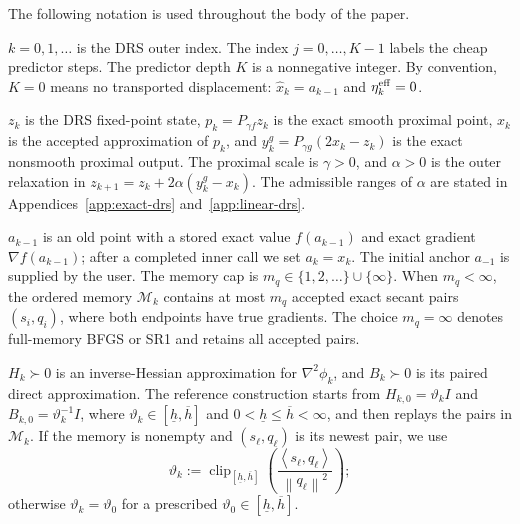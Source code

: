 \documentclass[10pt,leqno]{amsart}
\numberwithin{equation}{section}
\numberwithin{algorithm}{section}
\theoremstyle{remark}
\newcommand{\norm}[1]{\left\lVert #1 \right\rVert}
\newcommand{\ip}[2]{\left\langle #1,#2 \right\rangle}
\newcommand{\grad}{\nabla}
\begin{document}
The following notation is used throughout the body of the paper.
\begin{description}[style=nextline,leftmargin=2.8em,labelindent=0em]
\item[Outer and predictor indices.]
$k=0,1,\ldots$ is the DRS outer index.  The index $j=0,\ldots,K-1$ labels the cheap predictor steps.  The predictor depth $K$ is a nonnegative integer.  By convention, $K=0$ means no transported displacement: $\widehat x_k=a_{k-1}$ and $\eta_k^{\rm eff}=0$.

\item[DRS variables.]
$z_k$ is the DRS fixed-point state, $p_k=P_{\gamma f}z_k$ is the exact smooth proximal point, $x_k$ is the accepted approximation of $p_k$, and $y_k^g=P_{\gamma g}(2x_k-z_k)$ is the exact nonsmooth proximal output.  The proximal scale is $\gamma>0$, and $\alpha>0$ is the outer relaxation in $z_{k+1}=z_k+2\alpha(y_k^g-x_k)$.  The admissible ranges of $\alpha$ are stated in Appendices~\ref{app:exact-drs} and~\ref{app:linear-drs}.

\item[Exact anchor and memory.]
$a_{k-1}$ is an old point with a stored exact value $f(a_{k-1})$ and exact gradient $\grad f(a_{k-1})$; after a completed inner call we set $a_k=x_k$.  The initial anchor $a_{-1}$ is supplied by the user.  The memory cap is $m_q\in\{1,2,\ldots\}\cup\{\infty\}$.  When $m_q<\infty$, the ordered memory $\mathcal M_k$ contains at most $m_q$ accepted exact secant pairs $(s_i,q_i)$, where both endpoints have true gradients.  The choice $m_q=\infty$ denotes full-memory BFGS or SR1 and retains all accepted pairs.

\item[Curvature models.]
$H_k\succ0$ is an inverse-Hessian approximation for $\grad^2\phi_k$, and $B_k\succ0$ is its paired direct approximation.  The reference construction starts from $H_{k,0}=\vartheta_k I$ and $B_{k,0}=\vartheta_k^{-1}I$, where $\vartheta_k\in[\underline h,\overline h]$ and $0<\underline h\le\overline h<\infty$, and then replays the pairs in $\mathcal M_k$.  If the memory is nonempty and $(s_\ell,q_\ell)$ is its newest pair, we use
\begin{equation}
\label{eq:initial-qn-scaling}
  \vartheta_k
  :=\operatorname{clip}_{[\underline h,\overline h]}
       \left(\frac{\ip{s_\ell}{q_\ell}}{\norm{q_\ell}^2}\right);
\end{equation}
otherwise $\vartheta_k=\vartheta_0$ for a prescribed $\vartheta_0\in[\underline h,\overline h]$.


\end{description}
\end{document}
